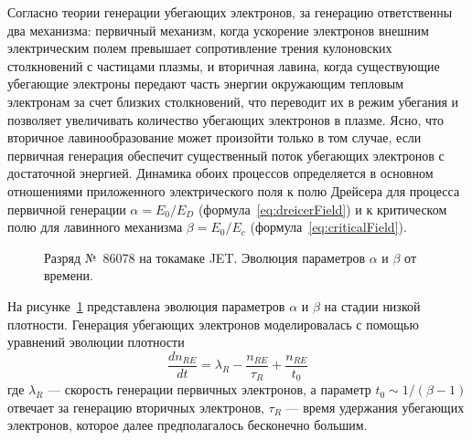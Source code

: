 Согласно теории генерации убегающих электронов, за генерацию ответственны два механизма: первичный механизм, когда ускорение электронов внешним электрическим полем превышает сопротивление трения кулоновских столкновений с частицами плазмы, и вторичная лавина, когда существующие убегающие электроны передают часть энергии окружающим тепловым электронам за счет близких столкновений, что переводит их в режим убегания и позволяет увеличивать количество убегающих электронов в плазме. Ясно, что вторичное лавинообразование может произойти только в том случае, если первичная генерация обеспечит существенный поток убегающих электронов с достаточной энергией. 
Динамика обоих процессов определяется в основном отношениями приложенного электрического поля к полю Дрейсера для процесса первичной генерации $\alpha = E_0/E_{D}$ (формула~\ref{eq:dreicerField}) и к критическом полю для лавинного механизма $\beta = E_0 / E_c $ (формула~\ref{eq:criticalField}).

\begin{figure}[ht!]
  \caption{ Разряд №~86078 на токамаке JET. Эволюция параметров $\alpha$ и $\beta$ от времени.~\cite{Plyusnin2015} }
  \label{fig:jetPulseAlphaBeta86078}
\end{figure}

На рисунке~\ref{fig:jetPulseAlphaBeta86078} представлена эволюция параметров $\alpha$ и $\beta$ на стадии низкой плотности. Генерация убегающих электронов моделировалась с помощью уравнений эволюции плотности
\begin{equation*}
  \frac{ d n_{RE} }{ d t } = \lambda_R - \frac{ n_{RE} }{ \tau_R } + \frac{ n_{RE} }{ t_0 }
\end{equation*}
где $\lambda_R$ --- скорость генерации первичных электронов, а параметр $t_0 \sim 1/(\beta - 1 )$ отвечает за генерацию вторичных электронов, $\tau_R$ --- время удержания убегающих электронов, которое далее предполагалось бесконечно большим.

